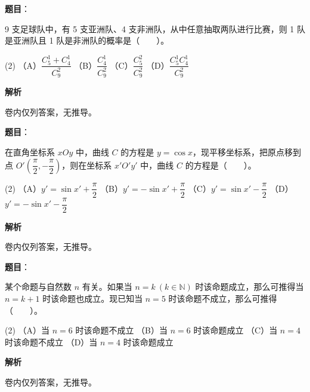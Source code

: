 \begin{answer}

\textbf{题目}：

9 支足球队中，有 5 支亚洲队、4 支非洲队，从中任意抽取两队进行比赛，则 1 队是亚洲队且 1 队是非洲队的概率是\mbox{（　　）}。

\begin{gkopts}(2)
\task （A）$\dfrac{C_5^1+C_4^1}{C_9^2}$
\task （B）$\dfrac{C_4^1}{C_9^2}$
\task （C）$\dfrac{C_5^2}{C_9^2}$
\task （D）$\dfrac{C_5^1C_4^1}{C_9^2}$
\end{gkopts}

\textbf{解析}

卷内仅列答案，无推导。


\end{answer}
\begin{answer}

\textbf{题目}：

在直角坐标系 $xOy$ 中，曲线 $C$ 的方程是 $y=\cos x$，现平移坐标系，把原点移到点 $O'\left(\dfrac\pi2,-\dfrac\pi2\right)$，则在坐标系 $x'O'y'$ 中，曲线 $C$ 的方程是\mbox{（　　）}。

\begin{gkopts}(2)
\task （A）$y'=\sin x'+\dfrac\pi2$
\task （B）$y'=-\sin x'+\dfrac\pi2$
\task （C）$y'=\sin x'-\dfrac\pi2$
\task （D）$y'=-\sin x'-\dfrac\pi2$
\end{gkopts}

\textbf{解析}

卷内仅列答案，无推导。


\end{answer}
\begin{answer}

\textbf{题目}：

某个命题与自然数 $n$ 有关。如果当 $n=k\ (k\in\mathbb N)$ 时该命题成立，那么可推得当 $n=k+1$ 时该命题也成立。现已知当 $n=5$ 时该命题不成立，那么可推得\mbox{（　　）}。

\begin{gkopts}(2)
\task （A）当 $n=6$ 时该命题不成立
\task （B）当 $n=6$ 时该命题成立
\task （C）当 $n=4$ 时该命题不成立
\task （D）当 $n=4$ 时该命题成立
\end{gkopts}

\textbf{解析}

卷内仅列答案，无推导。


\end{answer}

